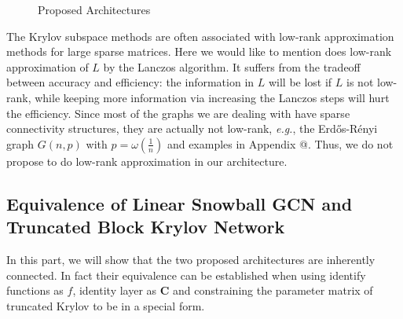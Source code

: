 \documentclass{article}
\makeatletter
\newcommand\eg{\textit{e.g.}}
\newcommand*{\rom}[1]{\expandafter\@slowromancap\romannumeral #1@}
\makeatother
\begin{document}
\begin{figure}[htbp]
\centering
{}
\hfill
{}
\caption{Proposed Architectures}
\label{fig:deep_gcn}
\end{figure}

The Krylov subspace methods are often associated with low-rank approximation methods for large sparse matrices.
Here we would like to mention \cite{liao2019lanczos} does low-rank approximation of $L$ by the Lanczos algorithm. It suffers from the tradeoff between accuracy and efficiency: the information in $L$ will be lost if $L$ is not low-rank, while keeping more information via increasing the Lanczos steps will hurt the efficiency. Since most of the graphs we are dealing with have sparse connectivity structures, they are actually not low-rank, \eg{}, the Erd\H{o}s-R\'enyi graph $G(n,p)$ with $p = \omega(\frac{1}{n})$ \cite{tran2013sparse} and examples in Appendix \rom{4}. Thus, we do not propose to do low-rank approximation in our architecture.

\subsection{Equivalence of Linear Snowball GCN and Truncated Block Krylov Network}
\label{linear_snowball}

In this part, we will show that the two proposed architectures are inherently connected.
In fact their equivalence can be established when using identify functions as $f$,
identity layer as $\bm{C}$ and constraining the parameter matrix of truncated Krylov to be in a special form.
\end{document}
